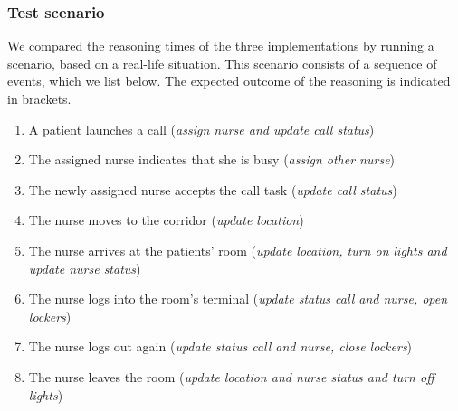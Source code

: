 \subsubsection{Test scenario}
We compared the reasoning times of the three implementations by running a scenario, based on a real-life situation.
This scenario consists of a sequence of events, which we list below. The expected outcome of the reasoning is indicated in brackets. 

\begin{enumerate}
\item
A patient launches a call (\emph{assign nurse and update call status})
\item
The assigned nurse indicates that she is busy (\emph{assign other nurse})
\item
The newly assigned nurse accepts the call task (\emph{update call status})
\item 
The nurse moves to the corridor (\emph{update location})
\item 
The nurse arrives at the patients' room (\emph{update location, turn on lights  and update nurse status})
\item 
The nurse logs into the room's terminal (\emph{update status call and nurse, open lockers})
\item 
The nurse logs out again (\emph{update status call and nurse, close lockers})
\item 
The nurse leaves the room (\emph{update location and nurse status and turn off lights})
\end{enumerate}

